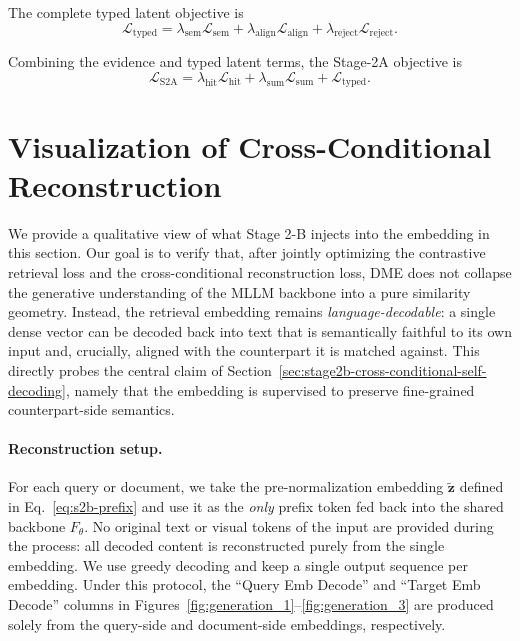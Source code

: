 The complete typed latent objective is
\begin{equation}
    \mathcal{L}_{\mathrm{typed}}
    =
    \lambda_{\mathrm{sem}}
    \mathcal{L}_{\mathrm{sem}}
    +
    \lambda_{\mathrm{align}}
    \mathcal{L}_{\mathrm{align}}
    +
    \lambda_{\mathrm{reject}}
    \mathcal{L}_{\mathrm{reject}}.
\label{eq:app-typed-latent-loss}
\end{equation}

Combining the evidence and typed latent terms, the Stage-2A objective is
\begin{equation}
    \mathcal{L}_{\mathrm{S2A}}
    =
    \lambda_{\mathrm{hit}}
    \mathcal{L}_{\mathrm{hit}}
    +
    \lambda_{\mathrm{sum}}
    \mathcal{L}_{\mathrm{sum}}
    +
    \mathcal{L}_{\mathrm{typed}}.
\label{eq:app-stage2a-objective}
\end{equation}

\section{Visualization of Cross-Conditional Reconstruction}
\label{app:generation-vis}

We provide a qualitative view of what Stage 2-B injects into the
embedding in this section. Our goal is to verify that, after jointly optimizing the contrastive retrieval loss and the cross-conditional reconstruction loss, DME does not collapse the generative understanding of the MLLM backbone into a pure similarity geometry. Instead, the retrieval embedding remains \emph{language-decodable}: a single dense vector can be decoded back into text that is semantically faithful to its own input and, crucially, aligned with the counterpart it is matched against. This directly probes the central claim of Section~\ref{sec:stage2b-cross-conditional-self-decoding}, namely that the embedding is supervised to preserve fine-grained counterpart-side semantics.

\paragraph{Reconstruction setup.}
For each query or document, we take the pre-normalization embedding $\tilde{\mathbf{z}}$ defined in Eq.~\eqref{eq:s2b-prefix} and use it as the \emph{only} prefix token fed back into the shared backbone $F_\theta$. No original text or visual tokens of the input are provided during the process: all decoded content is reconstructed purely from the single embedding. We use greedy decoding and keep a single output sequence per embedding. Under this protocol, the ``Query Emb Decode'' and ``Target Emb Decode'' columns in Figures~\ref{fig:generation_1}--\ref{fig:generation_3} are produced solely from the query-side and document-side embeddings, respectively.

